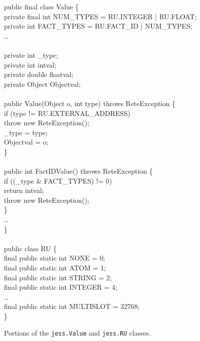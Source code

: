 \documentclass[preprint]{acmconf}
\begin{document}
\begin{figure}
\begin{samplecode}
public final class Value \{\\
\>private final int NUM\_TYPES = RU.INTEGER | RU.FLOAT;\\
\>private int FACT\_TYPES = RU.FACT\_ID | NUM\_TYPES;\\
\>\ldots\\
\\
\>private int            \_type;\\
\>private int            intval;\\
\>private double       floatval;\\
\>private Object      Objectval;\\
\\
\>public Value(Object o, int type) throws ReteException \{\\
\>\>if (type != RU.EXTERNAL\_ADDRESS)\\
\>\>\>throw new ReteException();\\
\>\>\_type = type;\\
\>\>Objectval = o;\\
\>\}\\
\\
\>public int FactIDValue() throws ReteException \{\\
\>\>if ((\_type {\&} FACT\_TYPES) != 0)\\
\>\>\>return intval;\\
\>\>throw new ReteException();\\
\>\}\\
\>\ldots\\
\}\\
\\
public class RU \{\\
\>final public static int NONE             =     0;\\
\>final public static int ATOM             =     1;\\
\>final public static int STRING           =     2;\\
\>final public static int INTEGER          =     4;\\
\>\ldots\\
\>final public static int MULTISLOT        = 32768;\\
\}\\
\end{samplecode}
\caption{Portions of the {\tt jess.Value} and {\tt jess.RU} classes.}
\label{fig:jess-classes}
\end{figure}
\end{document}
